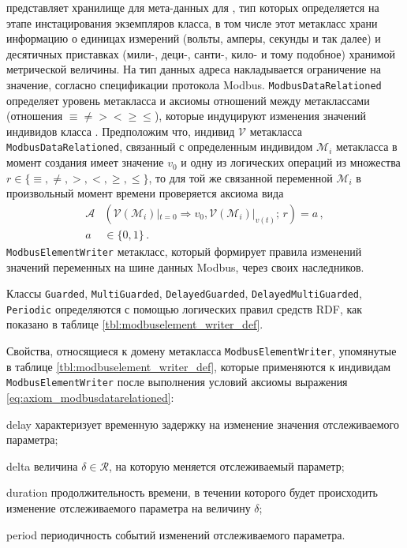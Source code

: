 \mbdata представляет хранилище для мета-данных для \mbelement, тип которых определяется на этапе инстацирования экземпляров класса,
    в том числе этот метакласс храни информацию о единицах измерений (вольты, амперы, секунды и так далее) и десятичных приставках (мили-, деци-, санти-, кило- и тому подобное)
    хранимой метрической величины.
На тип данных адреса накладывается ограничение на значение, согласно спецификации протокола Modbus.
%
\texttt{ModbusDataRelationed} определяет уровень метакласса и аксиомы отношений между метаклассами \mbdata
    (отношения $\equiv \ne > < \ge \le$), которые индуцируют изменения значений индивидов класса \mbdata.
    Предположим что, индивид $\mathcal{V}$ метакласса \texttt{ModbusDataRelationed}, связанный с определенным
    индивидом $\mathcal{M}_i$ метакласса \mbdata в момент создания имеет значение $v_0$ и одну из логических операций из множества $r \in \{\equiv,\ne,>,<,\ge,\le\}$,
    то для той же связанной переменной $\mathcal{M}_i$ в произвольный момент времени проверяется аксиома вида 
    \begin{equation}\label{eq:axiom_modbusdatarelationed}
        \begin{split}
            \mathcal{A}&\left(\mathcal{V}(\mathcal{M}_i)|_{t=0}\Rightarrow v_0, \mathcal{V}(\mathcal{M}_i)|_{v(t)};\, r\right) = a\,, {}\\
            a& \in \{0, 1\}\,.
        \end{split}
    \end{equation}
%
\texttt{ModbusElementWriter} метакласс, который формирует правила изменений значений переменных на шине данных Modbus,
    через своих наследников.

Классы \texttt{Guarded}, \texttt{MultiGuarded}, \texttt{DelayedGuarded}, \texttt{DelayedMultiGuarded}, \texttt{Periodic}
определяются с помощью логических правил средств RDF, как показано в таблице \ref{tbl:modbuselement_writer_def}.



Свойства, относящиеся к домену метакласса \texttt{ModbusElementWriter}, упомянутые в таблице \ref{tbl:modbuselement_writer_def},
которые применяются к индивидам \texttt{ModbusElementWriter} после выполнения условий аксиомы выражения \eqref{eq:axiom_modbusdatarelationed}:
\begin{enumerate*}[label=\arabic*\upshape)]
    \item delay характеризует временную задержку на изменение значения отслеживаемого параметра;
    \item delta величина $\delta \in \mathcal{R}$, на которую меняется отслеживаемый параметр;
    \item duration продолжительность времени, в течении которого будет происходить изменение отслеживаемого параметра на величину $\delta$;
    \item period периодичность событий изменений отслеживаемого параметра.
\end{enumerate*}

